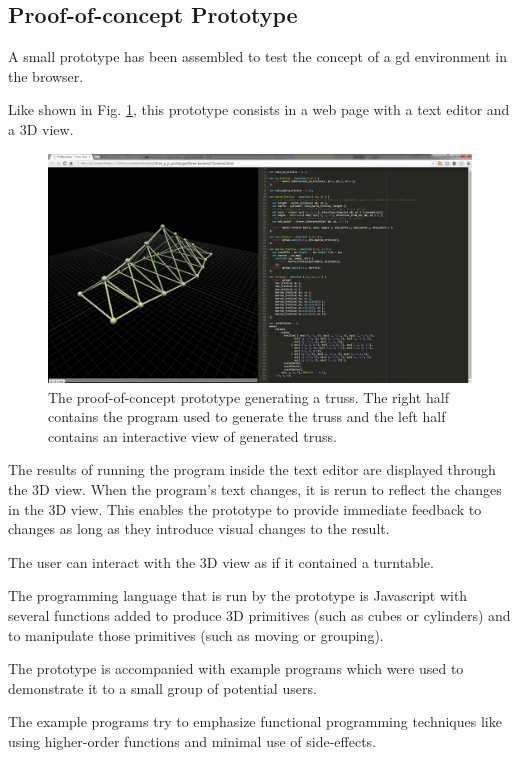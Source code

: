 \documentclass{./llncs2e/llncs}
\begin{document}
\subsection{Proof-of-concept Prototype}
	A small prototype has been assembled to test the concept of a \ac{gd} environment in the browser.

	Like shown in Fig. \ref{fig:proto:3d:p:editor}, this prototype consists in a web page with a text editor and a 3D view.

	\begin{figure}
	  \centering
	  \includegraphics[width=1.0\textwidth]{img/proto_3d_p_editor}
	    \caption{The proof-of-concept prototype generating a truss. The right half contains the program used to generate the truss and the left half contains an interactive view of generated truss.}
	  \label{fig:proto:3d:p:editor}
	\end{figure} 

	The results of running the program inside the text editor are displayed through the 3D view. 
	When the program's text changes, it is rerun to reflect the changes in the 3D view. 
	This enables the prototype to provide immediate feedback to changes as long as they introduce visual changes to the result.

	The user can interact with the 3D view as if it contained a turntable.

	The programming language that is run by the prototype is Javascript with several functions added to produce 3D primitives (such as cubes or cylinders) and to manipulate those primitives (such as moving or grouping).

	The prototype is accompanied with example programs which were used to demonstrate it to a small group of potential users.

	The example programs try to emphasize functional programming techniques like using higher-order functions and minimal use of side-effects.
\end{document}
